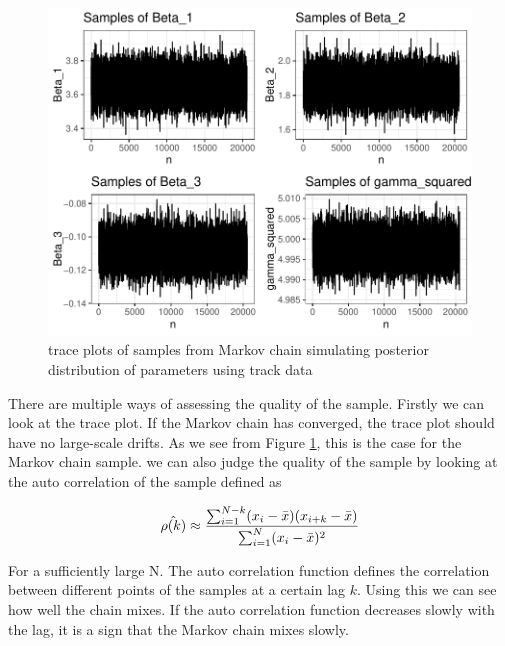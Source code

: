 \begin{figure}[H]
    \centering
    \includegraphics[width=\linewidth]{Images/ch3/MCMC_sample2_plot.pdf}
    \caption[MCMC1]{trace plots of samples from Markov chain simulating posterior distribution of parameters using track data}
    \label{fig:MCMC2_plot}
\end{figure}

There are multiple ways of assessing the quality of the sample. Firstly we can look at the trace plot. If the Markov chain has converged, the trace plot should have no large-scale drifts. As we see from Figure \ref{fig:MCMC2_plot}, this is the case for the Markov chain sample. we can also judge the quality of the sample by looking at the auto correlation of the sample defined as

$$
\hat{\rho(k)} \approx \frac{\sum_{i=1}^{N-k}(x_i-\Bar{x})(x_{i+k}-\Bar{x})}{\sum_{i=1}^N(x_i-\Bar{x})^2}
$$

For a sufficiently large N. The auto correlation function defines the correlation between different points of the samples at a certain lag $k$. Using this we can see how well the chain mixes. If the auto correlation function decreases slowly with the lag, it is a sign that the Markov chain mixes slowly. 

